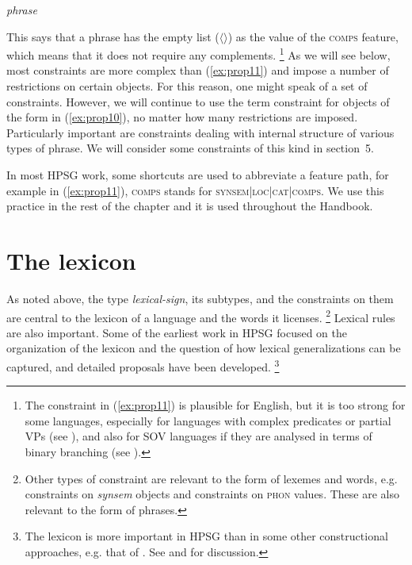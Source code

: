 \documentclass[output=paper
	        ,collection
	        ,collectionchapter
 	        ,biblatex
                ,babelshorthands
                ,newtxmath
                ,draftmode
                ,colorlinks, citecolor=brown
]{langscibook}
\begin{document}
\ea\label{ex:prop11}
\emph{phrase} 
\z

This says that a phrase has the empty list ($\langle \rangle$) as the value of the \textsc{comps} feature, which means that it does not require any complements.%
%
\footnote{The constraint in (\ref{ex:prop11}) is plausible for English, but it is too strong for some languages, especially for languages with complex predicates or partial VPs (see ), and also for SOV languages if they are analysed in terms of binary branching (see ).}
%
As we will see below, most constraints are more complex than (\ref{ex:prop11}) and impose a number of restrictions on certain objects. For this reason, one might speak of a set of constraints. However, we will continue to use the term constraint for objects of the form in (\ref{ex:prop10}), no matter how many restrictions are imposed. Particularly important are constraints dealing with internal structure of various types of phrase. We will consider some constraints of this kind in section~5.

In most HPSG work, some shortcuts are used to abbreviate a feature path, for example in (\ref{ex:prop11}), \textsc{comps} stands for \textsc{synsem|loc|cat|comps}. We use this practice in the rest of the chapter and it is used throughout the Handbook.


\section{The lexicon}

As noted above, the type \emph{lexical-sign}, its subtypes, and the constraints on them are central to the lexicon of a language and the words it licenses.%
%
\footnote{Other types of constraint are relevant to the form of lexemes and words, e.g. constraints on \emph{synsem} objects and constraints on \textsc{phon} values. These are also relevant to the form of phrases.}
%
Lexical rules are also important. Some of the earliest work in HPSG focused on the organization of the lexicon and the question of how lexical generalizations can be captured, and detailed proposals have been developed.%
%
\footnote{The lexicon is more important in HPSG than in some other constructional approaches, e.g. that of \citet{Goldberg95a,Goldberg2006a}. See \citet{MWArgSt} and  for discussion.}
%
\end{document}
